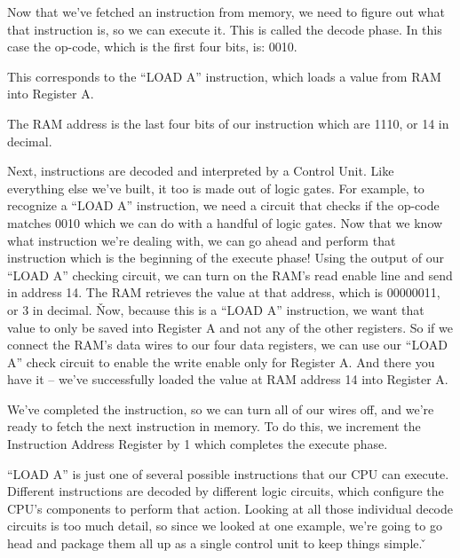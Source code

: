
Now that we've fetched an instruction from memory, we need to figure out what that instruction is, so we can execute
it. This is called the decode phase. In this case the op-code, which is the first four bits, is: 0010.


This corresponds to the ``LOAD A'' instruction, which loads a value from RAM into Register A\@.


The RAM address is the last four bits of our instruction which are 1110, or 14 in decimal.


Next, instructions are decoded and interpreted by a Control Unit. Like everything else we've built, it too is made
out of logic gates. For example, to recognize a ``LOAD A'' instruction, we need a circuit that checks if the op-code
matches 0010 which we can do with a handful of logic gates. Now that we know what instruction we're dealing with, we
can go ahead and perform that instruction which is the beginning of the execute phase! Using the output of our ``LOAD
A'' checking circuit, we can turn on the RAM's read enable line and send in address 14. The RAM retrieves the value
at that address, which is 00000011, or 3 in decimal. \v

Now, because this is a ``LOAD A'' instruction, we want that value to only be saved into Register A and not any of the
other registers. So if we connect the RAM's data wires to our four data registers, we can use our ``LOAD A'' check
circuit to enable the write enable only for Register A. And there you have it -- we've successfully loaded the value
at RAM address 14 into Register A\@.


We've completed the instruction, so we can turn all of our wires off, and we're ready to fetch the next instruction
in memory. To do this, we increment the Instruction Address Register by 1 which completes the execute phase.


``LOAD A'' is just one of several possible instructions that our CPU can execute. Different instructions are decoded
by different logic circuits, which configure the CPU's components to perform that action. Looking at all those
individual decode circuits is too much detail, so since we looked at one example, we're going to go head and package
them all up as a single control unit to keep things simple. \v

